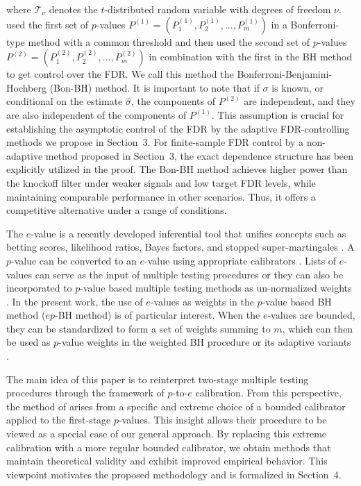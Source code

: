 \documentclass[11pt]{article}
\numberwithin{equation}{section}
\theoremstyle{plain}
\theoremstyle{remark}
\begin{document}
where $\mathcal{T}_\nu$ denotes the $t$-distributed random variable with degrees of freedom $\nu$. \citet{sarkar2022adjusting} used the first set of $p$-values $P^{(1)}=(P^{(1)}_1, P^{(1)}_2, ..., P^{(1)}_m)$ in a Bonferroni-type method with a common threshold and then used the second set of $p$-values $P^{(2)}=(P^{(2)}_1, P^{(2)}_2, ..., P^{(2)}_m)$ in combination with the first in the BH method to get control over the FDR. We call this method the Bonferroni-Benjamini-Hochberg (Bon-BH) method. It is important to note that if $\sigma$ is known, or conditional on the estimate $\hat{\sigma}$, the components of $P^{(2)}$ are independent, and they are also independent of the components of $P^{(1)}$. This assumption is crucial for establishing the asymptotic control of the FDR by the adaptive FDR-controlling methods we propose in Section~3. For finite-sample FDR control by a non-adaptive method proposed in Section~3, the exact dependence structure has been explicitly utilized in the proof. The Bon-BH method achieves higher power than the knockoff filter under weaker signals and low target FDR levels, while maintaining comparable performance in other scenarios. Thus, it offers a competitive alternative under a range of conditions.

The $e$-value is a recently developed inferential tool that unifies concepts such as betting scores, likelihood ratios, Bayes factors, and stopped super-martingales \citep{shafer2021testing, vovk2021evalues, grunwald2024safe, grunwald2024beyond, howard2021time}.
A $p$-value can be converted to an $e$-value using appropriate calibrators \citep{vovk2021evalues}.
Lists of $e$-values can serve as the input of multiple testing procedures \citep{wang2022false} or they can also be incorporated to $p$-value based multiple testing methods as un-normalized weights \citep{ignatiadis2024evalues}. In the present work, the use of $e$-values as weights in the $p$-value based BH method ($ep$-BH method) is of particular interest. When the $e$-values are bounded, they can be standardized to form a set of weights summing to $m$, which can then be used as $p$-value weights in the weighted BH procedure \citep{genovese2006false} or its adaptive variants \citep{Habiger2017adaptive, ramdas2019unified, biswas2023new}.

The main idea of this paper is to reinterpret two-stage multiple testing procedures through the framework of $p$-to-$e$ calibration. From this perspective, the method of \citet{sarkar2022adjusting} arises from a specific and extreme choice of a bounded calibrator applied to the first-stage $p$-values. This insight allows their procedure to be viewed as a special case of our general approach. By replacing this extreme calibration with a more regular bounded calibrator, we obtain methods that maintain theoretical validity and exhibit improved empirical behavior. This viewpoint motivates the proposed methodology and is formalized in Section~4.
\end{document}
